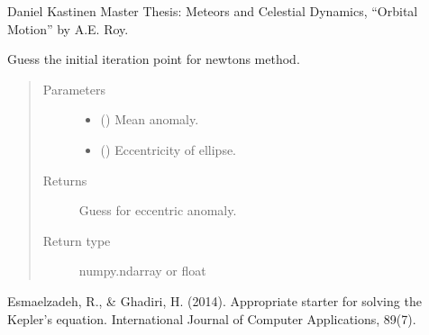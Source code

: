 \documentclass[letterpaper,10pt,english]{sphinxmanual}
\begin{document}
\begin{fulllineitems}
\begin{quote}
\begin{sphinxVerbatim}[commandchars=\\\{\}]
     
\PYG{p}{[}\PYG{p}{]}
\PYG{p}{[}\PYG{p}{]}
\end{sphinxVerbatim}
\end{quote}

 Daniel Kastinen Master Thesis: Meteors and Celestial Dynamics, “Orbital Motion” by A.E. Roy.

\end{fulllineitems}


\begin{fulllineitems}
\label{\detokenize{modules/dpt_tools:dpt_tools.kepler_guess}}
Guess the initial iteration point for newtons method.
\begin{quote}\begin{description}
\item[{Parameters}] \leavevmode\begin{itemize}
\item {} 
 () \textendash{} Mean anomaly.

\item {} 
 () \textendash{} Eccentricity of ellipse.

\end{itemize}

\item[{Returns}] \leavevmode
Guess for eccentric anomaly.

\item[{Return type}] \leavevmode
numpy.ndarray or float

\end{description}\end{quote}

 Esmaelzadeh, R., \& Ghadiri, H. (2014). Appropriate starter for solving the Kepler’s equation. International Journal of Computer Applications, 89(7).

\end{fulllineitems}
\end{document}
